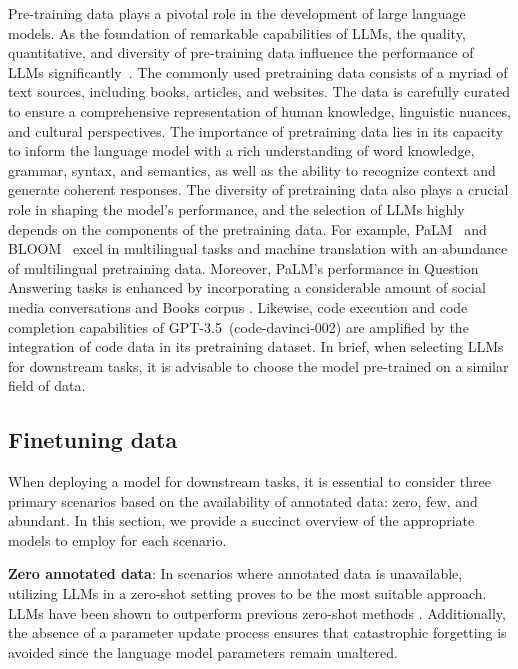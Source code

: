 \documentclass[manuscript,screen, nonacm]{acmart}
\begin{document}
Pre-training data plays a pivotal role in the development of large language models. As the foundation of remarkable capabilities \cite{alajrami2022does, kaplan2020scaling} of LLMs, the quality, quantitative, and diversity of pre-training data influence the performance of LLMs significantly~\cite{zha2023data}. The commonly used pretraining data consists of a myriad of text sources, including books, articles, and websites. The data is carefully curated to ensure a comprehensive representation of human knowledge, linguistic nuances, and cultural perspectives. The importance of pretraining data lies in its capacity to inform the language model with a rich understanding of word knowledge, grammar, syntax, and semantics, as well as the ability to recognize context and generate coherent responses.
The diversity of pretraining data also plays a crucial role in shaping the model's performance, and the selection of LLMs highly depends on the components of the pretraining data. For example, PaLM~\cite{chowdhery2022palm} and BLOOM~\cite{scao2022bloom} excel in multilingual tasks and machine translation with an abundance of multilingual pretraining data. Moreover, PaLM's performance in Question Answering tasks is enhanced by incorporating a considerable amount of social media conversations and Books corpus \cite{chowdhery2022palm}. Likewise,  code execution and code completion capabilities of GPT-3.5~(code-davinci-002) are amplified by the integration of code data in its pretraining dataset. In brief, when selecting LLMs for downstream tasks, it is advisable to choose the model pre-trained on a similar field of data.








\subsection{Finetuning data}
When deploying a model for downstream tasks, it is essential to consider three primary scenarios based on the availability of annotated data: zero, few, and abundant. In this section, we provide a succinct overview of the appropriate models to employ for each scenario.

\noindent\textbf{Zero annotated data}: 
In scenarios where annotated data is unavailable, utilizing LLMs in a zero-shot setting proves to be the most suitable approach. LLMs have been shown to outperform previous zero-shot methods \cite{yin2019benchmarking}. Additionally, the absence of a parameter update process ensures that catastrophic forgetting \cite{kirkpatrick2017overcoming} is avoided since the language model parameters remain unaltered.
\end{document}
